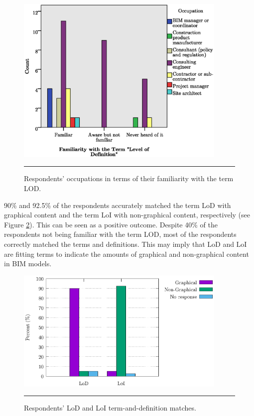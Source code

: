 \begin{figure}[htbp]
	\centering
	\includegraphics[width=0.9\textwidth]{figures/OccupationXLodCount.eps}
	\rule{0.9\textwidth}{0.5pt} %
	\caption{Respondents' occupations in terms of their familiarity with the term LOD.}
	\label{LODfam}
\end{figure}


90\% and 92.5\% of the respondents accurately matched the term LoD with graphical content and the term LoI with non-graphical content, respectively (see Figure \ref{lod_loi}).
This can be seen as a positive outcome.
Despite 40\% of the respondents not being familiar with the term LOD, most of the respondents correctly matched the terms and definitions.
This may imply that LoD and LoI are fitting terms to indicate the amounts of graphical and non-graphical content in BIM models.

\begin{figure}[htbp]
	\centering
	\includegraphics[width=0.9\textwidth]{figures/lod_loi.eps}
	\rule{0.9\textwidth}{0.5pt} %
	\caption{Respondents' LoD and LoI term-and-definition matches.}
	\label{lod_loi}
\end{figure}


